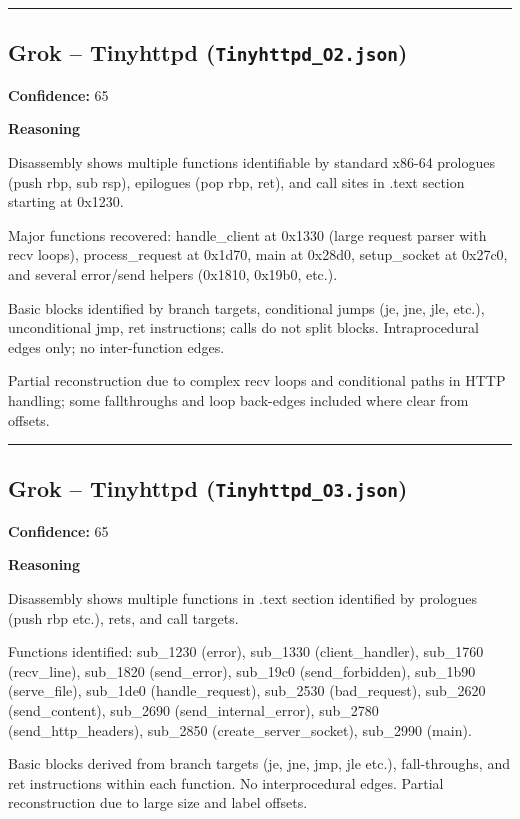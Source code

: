 \bigskip
\hrule
\bigskip

\subsection{Grok -- Tinyhttpd (\texttt{Tinyhttpd\_O2.json})}

\textbf{Confidence:} 65

\textbf{Reasoning}

Disassembly shows multiple functions identifiable by standard x86-64 prologues (push rbp, sub rsp), epilogues (pop rbp, ret), and call sites in .text section starting at 0x1230.

Major functions recovered: handle\_client at 0x1330 (large request parser with recv loops), process\_request at 0x1d70, main at 0x28d0, setup\_socket at 0x27c0, and several error/send helpers (0x1810, 0x19b0, etc.).

Basic blocks identified by branch targets, conditional jumps (je, jne, jle, etc.), unconditional jmp, ret instructions; calls do not split blocks. Intraprocedural edges only; no inter-function edges.

Partial reconstruction due to complex recv loops and conditional paths in HTTP handling; some fallthroughs and loop back-edges included where clear from offsets.

\bigskip
\hrule
\bigskip

\subsection{Grok -- Tinyhttpd (\texttt{Tinyhttpd\_O3.json})}

\textbf{Confidence:} 65

\textbf{Reasoning}

Disassembly shows multiple functions in .text section identified by prologues (push rbp etc.), rets, and call targets.

Functions identified: sub\_1230 (error), sub\_1330 (client\_handler), sub\_1760 (recv\_line), sub\_1820 (send\_error), sub\_19c0 (send\_forbidden), sub\_1b90 (serve\_file), sub\_1de0 (handle\_request), sub\_2530 (bad\_request), sub\_2620 (send\_content), sub\_2690 (send\_internal\_error), sub\_2780 (send\_http\_headers), sub\_2850 (create\_server\_socket), sub\_2990 (main).

Basic blocks derived from branch targets (je, jne, jmp, jle etc.), fall-throughs, and ret instructions within each function. No interprocedural edges. Partial reconstruction due to large size and label offsets.

